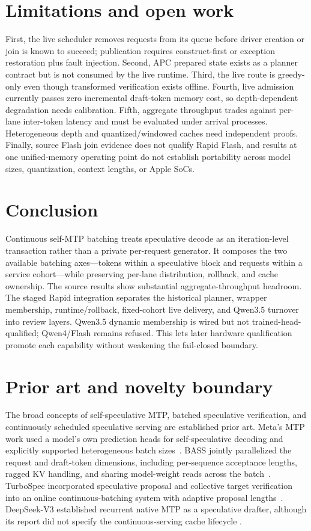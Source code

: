 \documentclass[10pt,twocolumn]{article}
\begin{document}
\section{Limitations and open work}
First, the live scheduler removes requests from its queue before driver
creation or join is known to succeed; publication requires construct-first or
exception restoration plus fault injection.  Second, APC prepared state exists
as a planner contract but is not consumed by the live runtime.  Third, the live
route is greedy-only even though transformed verification exists offline.
Fourth, live admission currently passes zero incremental draft-token memory
cost, so depth-dependent degradation needs calibration.  Fifth, aggregate
throughput trades against per-lane inter-token latency and must be evaluated
under arrival processes.  Heterogeneous depth and quantized/windowed caches
need independent proofs.  Finally, source Flash join evidence does not qualify
Rapid Flash, and results at one unified-memory operating point do not establish
portability across model sizes, quantization, context lengths, or Apple SoCs.

\section{Conclusion}
Continuous self-MTP batching treats speculative decode as an iteration-level
transaction rather than a private per-request generator.  It composes the two
available batching axes---tokens within a speculative block and requests
within a service cohort---while preserving per-lane distribution, rollback,
and cache ownership.  The source results show substantial aggregate-throughput
headroom.  The staged Rapid integration separates the historical planner,
wrapper membership, runtime/rollback, fixed-cohort live delivery, and Qwen3.5
turnover into review layers.  Qwen3.5 dynamic membership is wired but not
trained-head-qualified; Qwen4/Flash remains refused.  This lets later hardware
qualification promote each capability without weakening the fail-closed
boundary.

\section{Prior art and novelty boundary}
The broad concepts of self-speculative MTP, batched speculative verification,
and continuously scheduled speculative serving are established prior art.
Meta's MTP work used a model's own prediction heads for self-speculative
decoding and explicitly supported heterogeneous batch sizes~\cite{metamtp2024}.
BASS jointly parallelized the request and draft-token dimensions, including
per-sequence acceptance lengths, ragged KV handling, and sharing model-weight
reads across the batch~\cite{bass2024}.  TurboSpec incorporated
speculative proposal and collective target verification into an online
continuous-batching system with adaptive proposal lengths~\cite{smartspec2024}.
DeepSeek-V3 established recurrent native MTP as a speculative drafter, although
its report did not specify the continuous-serving cache lifecycle
\cite{deepseek2024}.
\end{document}
